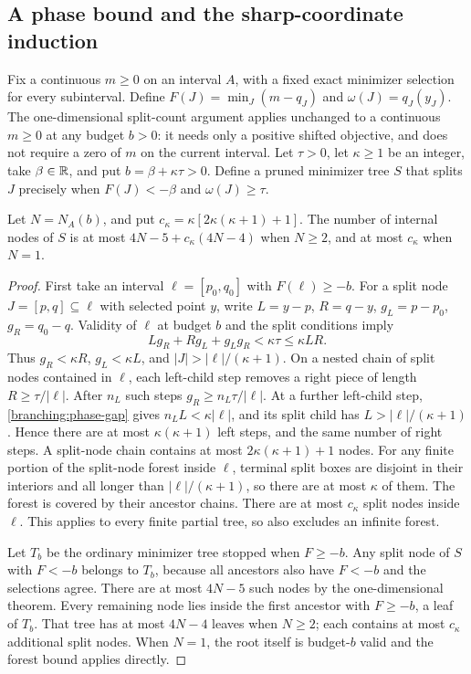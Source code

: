 \subsection{A phase bound and the sharp-coordinate induction}
\label{app:branching-sharp}

Fix a continuous $m\ge0$ on an interval $A$, with a fixed exact
minimizer selection for every subinterval. Define
$F(J)=\min_J(m-q_J)$ and $\omega(J)=q_J(y_J)$.
The one-dimensional split-count argument applies unchanged to a
continuous $m\ge0$ at any budget $b>0$: it needs only a positive shifted
objective, and does not require a zero of $m$ on the current interval.
Let $\tau>0$, let $\kappa\ge1$ be an integer, take $\beta\in\mathbb{R}$, and put
$b=\beta+\kappa\tau>0$. Define a pruned minimizer tree $S$ that
splits $J$ precisely when $F(J)<-\beta$ and $\omega(J)\ge\tau$.

\begin{lemma}
\label{branching:phase-lemma}
Let $N=N_A(b)$, and put $c_\kappa=\kappa[2\kappa(\kappa+1)+1]$.
The number of internal nodes of $S$ is at most
$4N-5+c_\kappa(4N-4)$ when $N\ge2$, and at most $c_\kappa$
when $N=1$.
\end{lemma}

\begin{proof}
First take an interval $\ell=[p_0,q_0]$ with $F(\ell)\ge-b$.
For a split node $J=[p,q]\subseteq\ell$ with selected point $y$,
write $L=y-p$, $R=q-y$, $g_L=p-p_0$, $g_R=q_0-q$.
Validity of $\ell$ at budget $b$ and the split conditions imply
\begin{equation}
 Lg_R+Rg_L+g_Lg_R<\kappa\tau\le\kappa LR.
 \label{branching:phase-gap}
\end{equation}
Thus $g_R<\kappa R$, $g_L<\kappa L$, and
$|J|>|\ell|/(\kappa+1)$.
On a nested chain of split nodes contained in $\ell$, each left-child
step removes a right piece of length $R\ge\tau/|\ell|$.
After $n_L$ such steps $g_R\ge n_L\tau/|\ell|$.
At a further left-child step, \eqref{branching:phase-gap} gives
$n_LL<\kappa|\ell|$, and its split child has
$L>|\ell|/(\kappa+1)$. Hence there are at most
$\kappa(\kappa+1)$ left steps, and the same number of right steps.
A split-node chain contains at most $2\kappa(\kappa+1)+1$ nodes.
For any finite portion of the split-node forest inside $\ell$, terminal
split boxes are disjoint in their interiors and all longer than
$|\ell|/(\kappa+1)$, so there are at most $\kappa$ of them.
The forest is covered by their ancestor chains. There are at most
$c_\kappa$ split nodes inside $\ell$. This applies to every finite
partial tree, so also excludes an infinite forest.

Let $T_b$ be the ordinary minimizer tree stopped when $F\ge-b$.
Any split node of $S$ with $F<-b$ belongs to $T_b$, because all
ancestors also have $F<-b$ and the selections agree. There are at
most $4N-5$ such nodes by the one-dimensional theorem. Every remaining
node lies inside the first ancestor with $F\ge-b$, a leaf of $T_b$.
That tree has at most $4N-4$ leaves when $N\ge2$; each contains at
most $c_\kappa$ additional split nodes. When $N=1$, the root itself
is budget-$b$ valid and the forest bound applies directly.
\end{proof}

